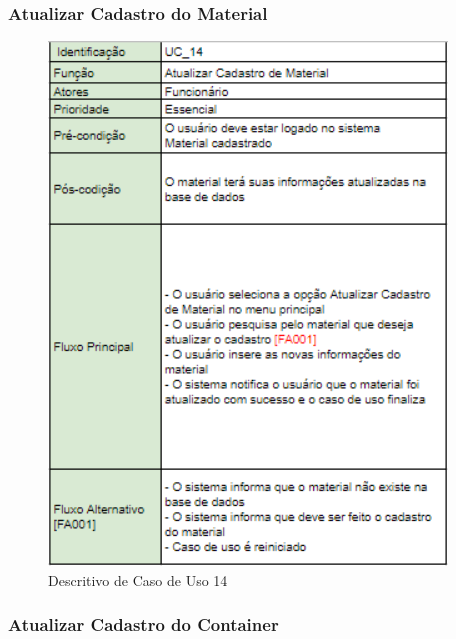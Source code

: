 \documentclass[rascunho,xindy,acronym,symbols]{fei}
\begin{document}
\subsubsection{Atualizar Cadastro do Material}

\begin{figure}[H]
    \centering
    \includegraphics[scale=0.6, width=300pt]{./Images/Descritivos/UC14.png}
    \caption{Descritivo de Caso de Uso 14}
     \label{fig:desc_uc14}
\end{figure}

\subsubsection{Atualizar Cadastro do Container}
\end{document}
